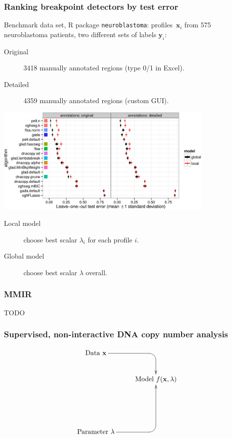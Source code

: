 \documentclass{beamer}
\begin{document}
\begin{frame}
  \frametitle{Ranking breakpoint detectors by test error}

  Benchmark data set, R package \texttt{neuroblastoma}:
  profiles~$\mathbf x_i$ from 575 neuroblastoma patients, two
  different sets of labels $\mathbf y_i$:
  \begin{description}
  \item[Original] 3418 manually annotated regions (type 0/1 in Excel).
  \item[Detailed] 4359 manually annotated regions (custom GUI).
  \end{description}

  \begin{center}
      \includegraphics[width=0.8\textwidth]{bams-test-error}
  \end{center}

  \begin{description}
  \item[Local model] choose best scalar $\lambda_i$ for each profile $i$.\\
  \item[Global model] choose best scalar $\lambda$ overall.
  \end{description}
\end{frame}

\begin{frame}
  \frametitle{MMIR}
  TODO
\end{frame}

\begin{frame}
  \frametitle{Supervised, non-interactive DNA copy number analysis}
  \begin{displaymath}
  \xymatrix{
    \text{Data $\mathbf x$}
    \ar `[r] [dr] 
    & \text{ }
    \\
    \color{white}{\text{Plot} }
    & 
    \text{Model $f(\mathbf x, \lambda)$} 
    \\
    \color{white}{\text{Labels $\mathbf y$}       }
    \\
    \text{Parameter $\lambda$} 
    \ar `r[ruu] [ruu]
    & \text{ }
  }
  \end{displaymath}
\end{frame}
\end{document}
